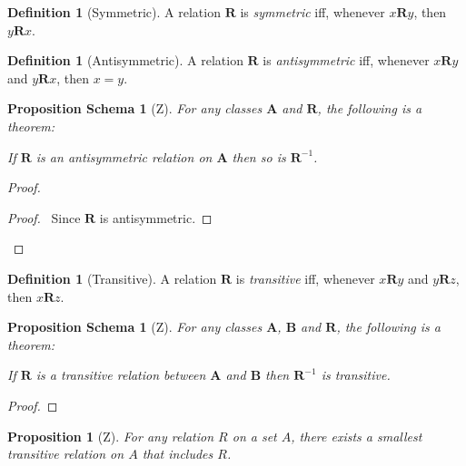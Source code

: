\documentclass{book}
\let\qed\relax
\newtheorem{prop}[ax]{Proposition}
\newtheorem{props}[ax]{Proposition Schema}
\theoremstyle{definition}
\newtheorem{df}[ax]{Definition}
\begin{document}
\begin{df}[Symmetric]
A relation $\mathbf{R}$ is \emph{symmetric} iff, whenever $x\mathbf{R}y$, then $y\mathbf{R}x$.
\end{df}

\begin{df}[Antisymmetric]
A relation $\mathbf{R}$ is \emph{antisymmetric} iff, whenever $x \mathbf{R} y$ and $y \mathbf{R} x$, then $x = y$.
\end{df}

\begin{props}[Z]
\label{prop:invantisym}
For any classes $\mathbf{A}$ and $\mathbf{R}$, the following is a theorem:

If $\mathbf{R}$ is an antisymmetric relation on $\mathbf{A}$ then so is $\mathbf{R}^{-1}$.
\end{props}

\begin{proof}
\pf
{}
\begin{proof}
	\pf\ Since $\mathbf{R}$ is antisymmetric.
\end{proof}
\qed
\end{proof}

\begin{df}[Transitive]
A relation $\mathbf{R}$ is \emph{transitive} iff, whenever $x\mathbf{R}y$ and $y \mathbf{R} z$, then $x\mathbf{R} z$.
\end{df}

\begin{props}[Z]
\label{prop:invtrans}
For any classes $\mathbf{A}$, $\mathbf{B}$ and $\mathbf{R}$, the following is a theorem:

If $\mathbf{R}$ is a transitive relation between $\mathbf{A}$ and $\mathbf{B}$ then $\mathbf{R}^{-1}$ is transitive.
\end{props}

\begin{proof}
\pf
{}
\qed
\end{proof}

\begin{prop}[Z]
For any relation $R$ on a set $A$, there exists a smallest transitive relation on $A$ that includes $R$.
\end{prop}
\end{document}
